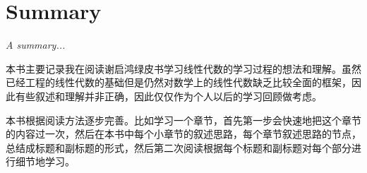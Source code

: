 \chapter*{Summary}

\emph{A summary...}

本书主要记录我在阅读谢启鸿绿皮书学习线性代数的学习过程的想法和理解。虽然已经工程的线性代数的基础但是仍然对数学上的线性代数缺乏比较全面的框架，因此有些叙述和理解并非正确，因此仅仅作为个人以后的学习回顾做考虑。

本书根据阅读方法逐步完善。比如学习一个章节，首先第一步会快速地把这个章节的内容过一次，然后在本书中每个小章节的叙述思路，每个章节叙述思路的节点，总结成标题和副标题的形式，然后第二次阅读根据每个标题和副标题对每个部分进行细节地学习。